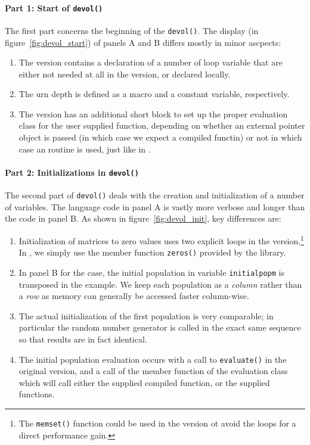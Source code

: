 \documentclass[nojss,shortnames,article]{jss}
\begin{document}
\paragraph{Part 1: Start of \texttt{devol()}} The first part concerns the
beginning of the \verb|devol()|. The display (in
figure~\ref{fig:devol_start}) of panels A and B differs mostly in minor
ascpects:
\begin{enumerate}
\item The  version contains a declaration of a number of loop
  variable that are either not needed at all in the  version,
  or declared locally.
\item The urn depth is defined as a  macro and a constant
  variable, respectively.
\item The  version has an additional short block to set up the
  proper evaluation class for the user supplied function, depending on
  whether an external pointer object is passed (in which case we expect a
  compiled functin) or not in which case an  routine is used,
  just like in .
\end{enumerate}

\paragraph{Part 2: Initializations in \texttt{devol()}} The second part of
\verb|devol()| deals with the creation and initialization of a number of
variables.  The  language code in panel A is vastly more verbose
and longer than the  code in panel B. As shown in
figure~\ref{fig:devol_init}, key differences are:
\begin{enumerate}
\item Initialization of matrices to zero values uses two explicit loops in
  the  version.\footnote{The \texttt{memset()} function could be
    used in the  version ot avoid the loops for a direct
    performance gain.}  In , we simply use the member function
  \verb|zeros()| provided by the  library.
\item In panel B for the  case, the initial population in
  variable \texttt{initialpopm} is transposed in the 
  example. We keep each population as a \textsl{column} rather than a
  \textsl{row} as memory can generally be accessed faster column-wise.
\item The actual initialization of the first population is very comparable;
  in particular the  random number generator is called in the
  exact same sequence so that results are in fact identical.
\item The initial population evaluation occurs with a call to
  \verb|evaluate()| in the original version, and a call of the member
  function of the evaluation class which will call either the supplied
  compiled function, or the supplied  functions.
\end{enumerate}
\end{document}

